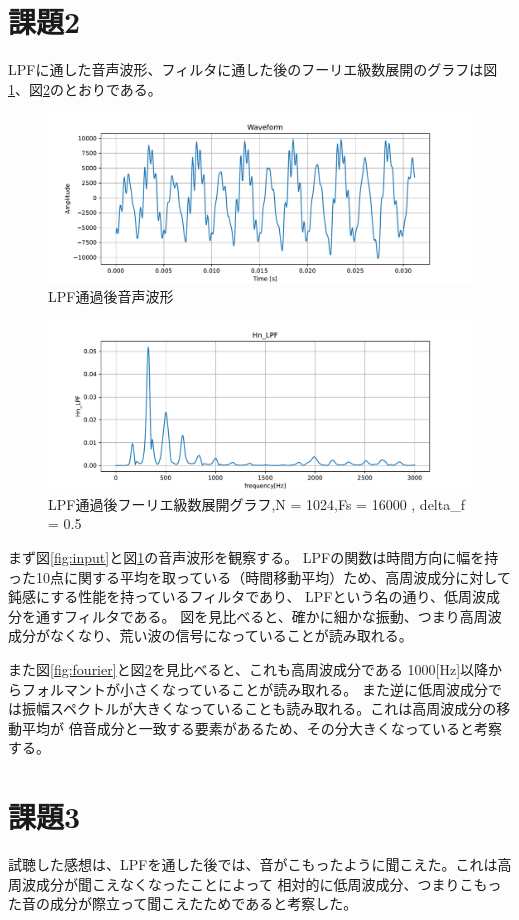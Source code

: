 \documentclass[a4j,11pt]{jarticle}
\begin{document}
    \section{課題2}
    LPFに通した音声波形、フィルタに通した後のフーリエ級数展開のグラフは図\ref{fig:LPF}、図\ref{fig:LPF_fourier}のとおりである。
    \begin{figure}[tb]
        \centering
        \includegraphics[width=0.8\hsize]{../../figure/arayurugennzituwo_LPF_reconst.pdf}
        \caption{LPF通過後音声波形}
        \label{fig:LPF}
    \end{figure}
    \begin{figure}[tb]
        \centering
        \includegraphics[width=0.8\hsize]{../../figure/arayurugennzituwo_Hn_LPF.pdf}
        \caption{LPF通過後フーリエ級数展開グラフ,N = 1024,Fs = 16000 , delta\_f = 0.5}
        \label{fig:LPF_fourier}
    \end{figure}
    まず図\ref{fig:input}と図\ref{fig:LPF}の音声波形を観察する。
    LPFの関数は時間方向に幅を持った10点に関する平均を取っている（時間移動平均）ため、高周波成分に対して鈍感にする性能を持っているフィルタであり、
    LPFという名の通り、低周波成分を通すフィルタである。
    図を見比べると、確かに細かな振動、つまり高周波成分がなくなり、荒い波の信号になっていることが読み取れる。

    また図\ref{fig:fourier}と図\ref{fig:LPF_fourier}を見比べると、これも高周波成分である
    1000[Hz]以降からフォルマントが小さくなっていることが読み取れる。
    また逆に低周波成分では振幅スペクトルが大きくなっていることも読み取れる。これは高周波成分の移動平均が
    倍音成分と一致する要素があるため、その分大きくなっていると考察する。
    \section{課題3}
    試聴した感想は、LPFを通した後では、音がこもったように聞こえた。これは高周波成分が聞こえなくなったことによって
    相対的に低周波成分、つまりこもった音の成分が際立って聞こえたためであると考察した。
\end{document}
